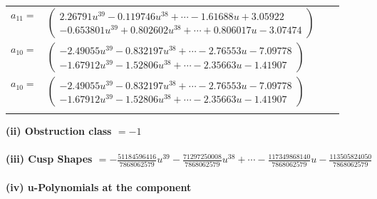 \documentclass[1p]{elsarticle_modified}
\theoremstyle{definition}
\begin{document}
\begin{tabular}{m{7pt} m{180pt} m{7pt} m{180pt} }
\flushright $a_{11}=$&$\begin{pmatrix}2.26791 u^{39}-0.119746 u^{38}+\cdots-1.61688 u+3.05922\\-0.653801 u^{39}+0.802602 u^{38}+\cdots+0.806017 u-3.07474\end{pmatrix}$ \\
\flushright $a_{10}=$&$\begin{pmatrix}-2.49055 u^{39}-0.832197 u^{38}+\cdots-2.76553 u-7.09778\\-1.67912 u^{39}-1.52806 u^{38}+\cdots-2.35663 u-1.41907\end{pmatrix}$\\ \flushright $a_{10}=$&$\begin{pmatrix}-2.49055 u^{39}-0.832197 u^{38}+\cdots-2.76553 u-7.09778\\-1.67912 u^{39}-1.52806 u^{38}+\cdots-2.35663 u-1.41907\end{pmatrix}$\\&\end{tabular}
\flushleft \textbf{(ii) Obstruction class $= -1$}\\~\\
\flushleft \textbf{(iii) Cusp Shapes $= -\frac{51184596416}{7868062579} u^{39}-\frac{71297250008}{7868062579} u^{38}+\cdots-\frac{117349868140}{7868062579} u-\frac{113505824050}{7868062579}$}\\~\\
\newpage\renewcommand{\arraystretch}{1}
\flushleft \textbf{(iv) u-Polynomials at the component}\newline \\
\end{document}

